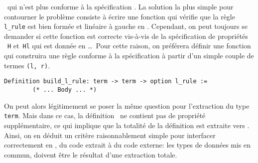 \ocaml\ qui n'est plus conforme à la spécification \coq. La solution la plus simple pour contourner le problème consiste 
à écrire une fonction qui vérifie que la règle \lstinline!l_rule! est bien formée et linéaire à gauche en \ocaml.
Cependant, on peut toujours se demander si cette fonction est correcte vis-à-vis de la spécification de propriétés
~\lstinline!H! et~\lstinline!Hl! qui est donnée en \coq\dots\ Pour cette raison, on préférera définir une fonction qui 
construira une règle conforme à la spécification à partir d'un simple couple de termes \lstinline!(l, r)!.
\switchlstcoq
\begin{lstlisting}
Definition build_l_rule: term -> term -> option l_rule :=
        (* ... Body ... *)
\end{lstlisting}
On peut alors légitimement se poser la même question pour l'extraction du type \lstinline!term!. 
Mais dans ce cas, la définition \coq\ ne contient pas de propriété supplémentaire, ce qui implique
que la totalité de la définition est extraite vers \ocaml.
Ainsi, on en déduit un critère raisonnablement simple pour interfacer correctement en \ocaml, du code extrait
à du code externe: les types de données mis en commun, doivent être le résultat d'une extraction totale.


